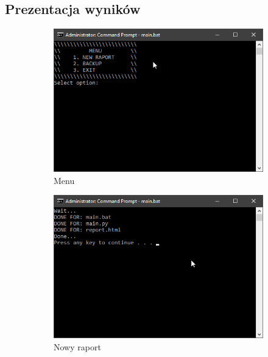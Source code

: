 \documentclass[]{article}
\begin{document}
\subsection{Prezentacja wyników}
\begin{figure}[H]
\begin{subfigure}{.3\textwidth}
	\centering
	\includegraphics[width=1\linewidth]{prezentacja_1}
	\caption{Menu}
	\label{fig:p1}
\end{subfigure}
\begin{subfigure}{.3\textwidth}
	\centering
	\includegraphics[width=1\linewidth]{prezentacja_2}
	\caption{Nowy raport}
	\label{fig:p2}
\end{subfigure}
\begin{subfigure}{.3\textwidth}
	\centering

\end{subfigure}
\end{figure}
\end{document}
